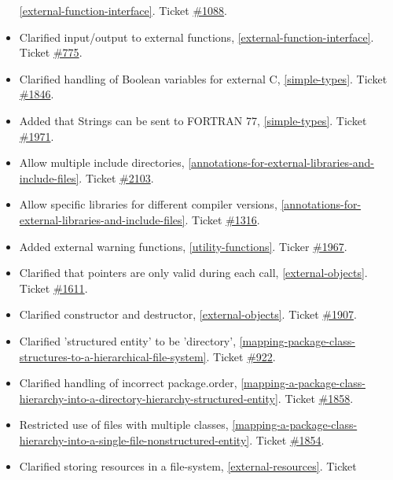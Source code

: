 \documentclass[../MLS.tex]{subfiles}
\begin{document}
\begin{itemize}
  \autoref{external-function-interface}. Ticket
  \href{https://trac.modelica.org/Modelica/ticket/1088}{\#1088}.
\item
  Clarified input/output to external functions, \autoref{external-function-interface}. Ticket
  \href{https://trac.modelica.org/Modelica/ticket/775}{\#775}.
\item
  Clarified handling of Boolean variables for external C, 
  \autoref{simple-types}. Ticket
  \href{https://trac.modelica.org/Modelica/ticket/1846}{\#1846}.
\item
  Added that Strings can be sent to FORTRAN 77, \autoref{simple-types}. Ticket
  \href{https://trac.modelica.org/Modelica/ticket/1971}{\#1971}.
\item
  Allow multiple include directories, \autoref{annotations-for-external-libraries-and-include-files}. Ticket
  \href{https://trac.modelica.org/Modelica/ticket/2103}{\#2103}.
\item
  Allow specific libraries for different compiler versions, 
  \autoref{annotations-for-external-libraries-and-include-files}. Ticket
  \href{https://trac.modelica.org/Modelica/ticket/1316}{\#1316}.
\item
  Added external warning functions, \autoref{utility-functions}. Ticker
  \href{https://trac.modelica.org/Modelica/ticket/1967}{\#1967}.
\item
  Clarified that pointers are only valid during each call, \autoref{external-objects}. Ticket
  \href{https://trac.modelica.org/Modelica/ticket/1611}{\#1611}.
\item
  Clarified constructor and destructor, \autoref{external-objects}. Ticket
  \href{https://trac.modelica.org/Modelica/ticket/1907}{\#1907}.
\item
  Clarified 'structured entity' to be 'directory', \autoref{mapping-package-class-structures-to-a-hierarchical-file-system}.
  Ticket \href{https://trac.modelica.org/Modelica/ticket/922}{\#922}.
\item
  Clarified handling of incorrect package.order, \autoref{mapping-a-package-class-hierarchy-into-a-directory-hierarchy-structured-entity}.
  Ticket \href{https://trac.modelica.org/Modelica/ticket/1858}{\#1858}.
\item
  Restricted use of files with multiple classes, \autoref{mapping-a-package-class-hierarchy-into-a-single-file-nonstructured-entity}.
  Ticket \href{https://trac.modelica.org/Modelica/ticket/1854}{\#1854}.
\item
  Clarified storing resources in a file-system, \autoref{external-resources}. Ticket

\end{itemize}
\end{document}
